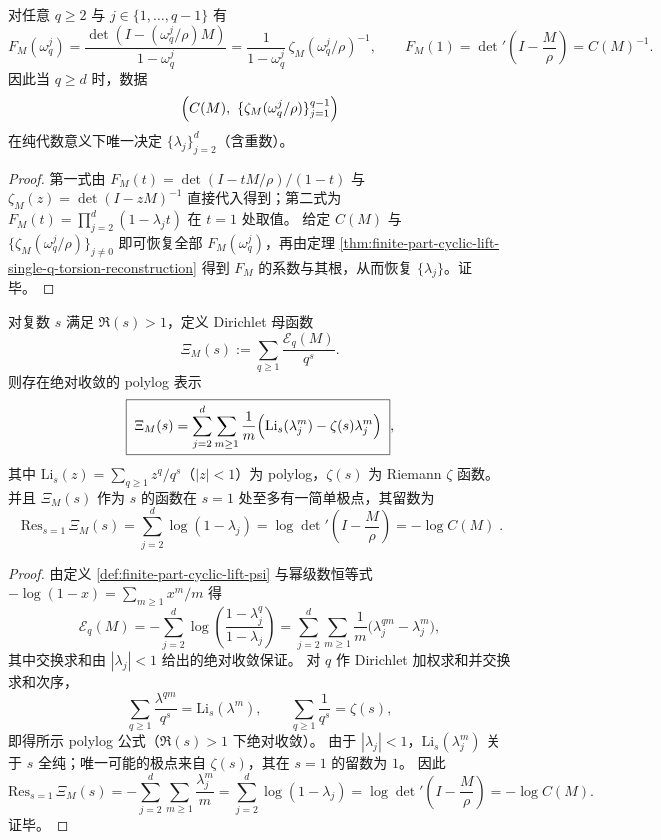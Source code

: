 \begin{corollary}\label{cor:finite-part-cyclic-lift-zeta-torsion-determines-spectrum}
对任意 \(q\ge 2\) 与 \(j\in\{1,\dots,q-1\}\) 有
\[
F_M(\omega_q^j)=\frac{\det(I-(\omega_q^j/\rho)M)}{1-\omega_q^j}
=\frac{1}{1-\omega_q^j}\,\zeta_M(\omega_q^j/\rho)^{-1},
\qquad
F_M(1)=\det\nolimits'\!\left(I-\frac{M}{\rho}\right)=C(M)^{-1}.
\]
因此当 \(q\ge d\) 时，数据
\[
\Bigl(C(M),\ \{\zeta_M(\omega_q^j/\rho)\}_{j=1}^{q-1}\Bigr)
\]
在纯代数意义下唯一决定 \(\{\lambda_j\}_{j=2}^{d}\)（含重数）。
\end{corollary}
\begin{proof}
第一式由 \(F_M(t)=\det(I-tM/\rho)/(1-t)\) 与 \(\zeta_M(z)=\det(I-zM)^{-1}\) 直接代入得到；第二式为 \(F_M(t)=\prod_{j=2}^{d}(1-\lambda_j t)\) 在 \(t=1\) 处取值。
给定 \(C(M)\) 与 \(\{\zeta_M(\omega_q^j/\rho)\}_{j\ne 0}\) 即可恢复全部 \(F_M(\omega_q^j)\)，再由定理 \ref{thm:finite-part-cyclic-lift-single-q-torsion-reconstruction} 得到 \(F_M\) 的系数与其根，从而恢复 \(\{\lambda_j\}\)。证毕。
\end{proof}

\begin{theorem}\label{thm:finite-part-cyclic-lift-polylog-dirichlet-xi}
对复数 \(s\) 满足 \(\Re(s)>1\)，定义 Dirichlet 母函数
\[
\Xi_M(s):=\sum_{q\ge 1}\frac{\mathcal{E}_q(M)}{q^s}.
\]
则存在绝对收敛的 polylog 表示
\[
\boxed{\;
\Xi_M(s)=\sum_{j=2}^{d}\sum_{m\ge 1}\frac{1}{m}\Bigl(\mathrm{Li}_s(\lambda_j^{m})-\zeta(s)\lambda_j^{m}\Bigr)\; },
\]
其中 \(\mathrm{Li}_s(z)=\sum_{q\ge 1}z^{q}/q^{s}\)（\(|z|<1\)）为 polylog，\(\zeta(s)\) 为 Riemann \(\zeta\) 函数。
并且 \(\Xi_M(s)\) 作为 \(s\) 的函数在 \(s=1\) 处至多有一简单极点，其留数为
\[
\boxed{\;
\mathrm{Res}_{s=1}\,\Xi_M(s)
=\sum_{j=2}^{d}\log(1-\lambda_j)
=\log\det\nolimits'\!\left(I-\frac{M}{\rho}\right)
=-\log C(M)\; }.
\]
\end{theorem}
\begin{proof}
由定义 \ref{def:finite-part-cyclic-lift-psi} 与幂级数恒等式 \(-\log(1-x)=\sum_{m\ge 1}x^m/m\) 得
\[
\mathcal{E}_q(M)=-\sum_{j=2}^{d}\log\!\left(\frac{1-\lambda_j^{q}}{1-\lambda_j}\right)
=\sum_{j=2}^{d}\sum_{m\ge 1}\frac{1}{m}\bigl(\lambda_j^{qm}-\lambda_j^{m}\bigr),
\]
其中交换求和由 \(|\lambda_j|<1\) 给出的绝对收敛保证。
对 \(q\) 作 Dirichlet 加权求和并交换求和次序，
\[
\sum_{q\ge 1}\frac{\lambda^{qm}}{q^s}=\mathrm{Li}_s(\lambda^m),
\qquad
\sum_{q\ge 1}\frac{1}{q^s}=\zeta(s),
\]
即得所示 polylog 公式（\(\Re(s)>1\) 下绝对收敛）。
由于 \(|\lambda_j|<1\)，\(\mathrm{Li}_s(\lambda_j^m)\) 关于 \(s\) 全纯；唯一可能的极点来自 \(\zeta(s)\)，其在 \(s=1\) 的留数为 \(1\)。
因此
\[
\mathrm{Res}_{s=1}\,\Xi_M(s)
=-\sum_{j=2}^{d}\sum_{m\ge 1}\frac{\lambda_j^{m}}{m}
=\sum_{j=2}^{d}\log(1-\lambda_j)
=\log\det\nolimits'\!\left(I-\frac{M}{\rho}\right)
=-\log C(M).
\]
证毕。
\end{proof}

